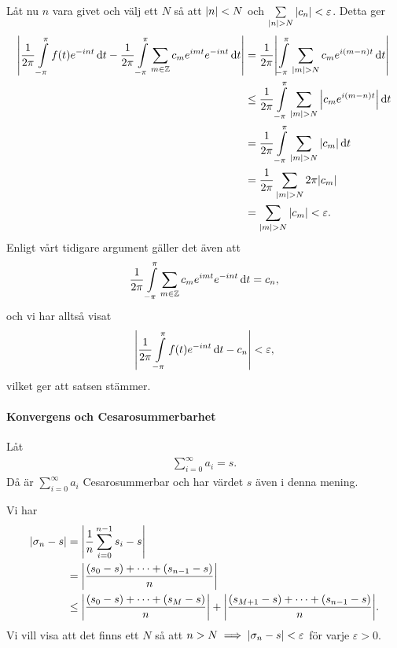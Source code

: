 Låt nu $n$ vara givet och välj ett $N$ så att $\abs{n} < N$ och $\sum\limits_{\abs{n} > N}\abs{c_{n}} < \varepsilon$. Detta ger
\begin{align*}
	\abs{\frac{1}{2\pi}\int\limits_{-\pi}^{\pi}f(t)e^{-int}\dd{t} - \frac{1}{2\pi}\int\limits_{-\pi}^{\pi}\sum\limits_{m\in\mathbb{Z}}c_{m}e^{imt}e^{-int}\dd{t}} &= \frac{1}{2\pi}\abs{\int\limits_{-\pi}^{\pi}\sum\limits_{\abs{m} > N}c_{m}e^{i(m - n)t}\dd{t}} \\
	                                      &\leq \frac{1}{2\pi}\int\limits_{-\pi}^{\pi}\sum\limits_{\abs{m} > N}\abs{c_{m}e^{i(m - n)t}}\dd{t} \\
	                                      &= \frac{1}{2\pi}\int\limits_{-\pi}^{\pi}\sum\limits_{\abs{m} > N}\abs{c_{m}}\dd{t} \\
	                                      &= \frac{1}{2\pi}\sum\limits_{\abs{m} > N}2\pi\abs{c_{m}} \\
	                                      &= \sum\limits_{\abs{m} > N}\abs{c_{m}} < \varepsilon.
\end{align*}
Enligt vårt tidigare argument gäller det även att
\begin{align*}
	\frac{1}{2\pi}\int\limits_{-\pi}^{\pi}\sum\limits_{m\in\mathbb{Z}}c_{m}e^{imt}e^{-int}\dd{t} = c_{n},
\end{align*}
och vi har alltså visat
\begin{align*}
	\abs{\frac{1}{2\pi}\int\limits_{-\pi}^{\pi}f(t)e^{-int}\dd{t} - c_{n}} < \varepsilon,
\end{align*}
vilket ger att satsen stämmer.

\paragraph{Konvergens och Cesarosummerbarhet}
Låt
\begin{align*}
	\sum\limits_{i = 0}^{\infty}a_{i} = s.
\end{align*}
Då är $\sum\limits_{i = 0}^{\infty}a_{i}$ Cesarosummerbar och har värdet $s$ även i denna mening.

\proof
Vi har
\begin{align*}
	\abs{\sigma_{n} - s} &= \abs{\frac{1}{n}\sum\limits_{i = 0}^{n - 1}s_{i} - s} \\
	                     &= \abs{\frac{(s_{0} - s) + \dots + (s_{n - 1} - s)}{n}} \\
	                     &\leq  \abs{\frac{(s_{0} - s) + \dots + (s_{M} - s)}{n}} + \abs{\frac{(s_{M + 1} - s) + \dots + (s_{n - 1} - s)}{n}}.
\end{align*}
Vi vill visa att det finns ett $N$ så att $n > N\implies \abs{\sigma_{n} - s} < \varepsilon$ för varje $\varepsilon > 0$.

